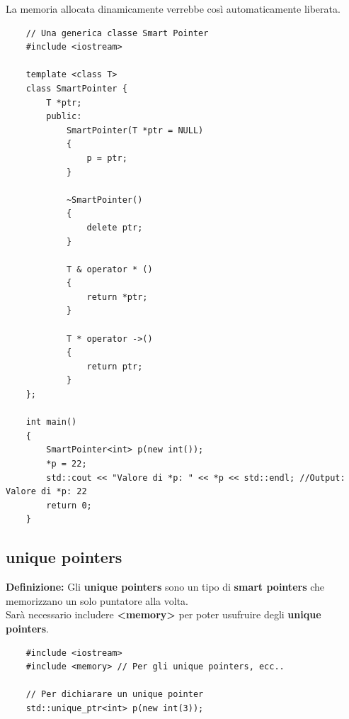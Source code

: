\textsf{\small La memoria allocata dinamicamente verrebbe così automaticamente liberata.} \\

\begin{lstlisting}
	// Una generica classe Smart Pointer
	#include <iostream>
	
	template <class T>
	class SmartPointer {
		T *ptr;
		public:
			SmartPointer(T *ptr = NULL)
			{
				p = ptr;
			}
		
			~SmartPointer()
			{
				delete ptr;
			}
		
			T & operator * ()
			{
				return *ptr;
			}
		
			T * operator ->()
			{
				return ptr;
			}
	};

	int main()
	{
		SmartPointer<int> p(new int());
		*p = 22;
		std::cout << "Valore di *p: " << *p << std::endl; //Output: Valore di *p: 22
		return 0;
	}
\end{lstlisting}





\subsection{unique pointers}

\textsf{\small \textbf{Definizione: } Gli \textbf{unique pointers} sono un tipo di \textbf{smart pointers} che memorizzano un solo puntatore alla volta.} \\

\textsf{\small Sarà necessario includere \textbf{<memory>} per poter usufruire degli \textbf{unique pointers}.} \\

\begin{lstlisting}
	#include <iostream>
	#include <memory> // Per gli unique pointers, ecc..
	
	// Per dichiarare un unique pointer
	std::unique_ptr<int> p(new int(3));
\end{lstlisting}

